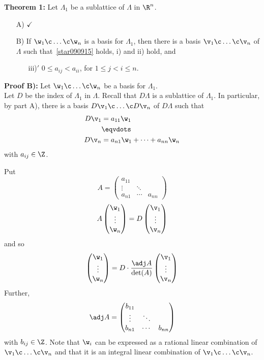\textbf{Theorem 1:} Let $\Lambda_1$ be a sublattice of $\Lambda$ in $\R^n$.
\begin{enumerate}
\item[A)] $\checkmark$
\item[B)] If $\w_1\c \dotsc\c \w_n$ is a basis for $\Lambda_1$, then there is a basis $\v_1\c \dotsc\c \v_n$ of $\Lambda$ such that~\eqref{star090915} holds, i) and ii) hold, and
\begin{enumerate}
\item[iii)$'$] $0\leq a_{ij} < a_{ii}$, for $1\leq j<i\leq n$.
\end{enumerate}
\end{enumerate}
\textbf{Proof B):} Let $\w_1\c \dotsc\c \w_n$ be a basis for $\Lambda_1$. \\ Let $D$ be the index of $\Lambda_1$ in $\Lambda$.  Recall that $D\Lambda$ is a sublattice of $\Lambda_1$.  In particular, by part A), there is a basis $D\v_1\c \dotsc\c D\v_n$ of $D\Lambda$ such that
\begin{align*}
D\v_1 &= a_{11}\w_1 \\
&\eqvdots \\
D\v_n &= a_{n1}\w_1 + \dotsb + a_{nn}\w_n
\end{align*}
with $a_{ij}\in\Z$.

Put
\[ A = \begin{pmatrix}
a_{11} & & \\
\vdots & \ddots & \\
a_{n1} & \cdots & a_{nn}
\end{pmatrix} \]
\[ A \begin{pmatrix}
\w_1 \\
\vdots \\
\w_n
\end{pmatrix} = 
D \begin{pmatrix}
\v_1 \\
\vdots \\
\v_n
\end{pmatrix} \]
and so
\[ \begin{pmatrix}
\w_1 \\
\vdots \\
\w_n
\end{pmatrix} =
D\cdot\frac{\adj A}{\det(A)} \begin{pmatrix}
\v_1 \\
\vdots \\
\v_n
\end{pmatrix} \]
Further,%
\[ \adj A = \begin{pmatrix}
b_{11} & & \\
\vdots & \ddots & \\
b_{n1} & \cdots & b_{nn}
\end{pmatrix} \]
with $b_{ij}\in\Z$.  Note that $\w_i$ can be expressed as a rational linear combination of $\v_1\c \dotsc\c \v_n$ and that it is an integral linear combination of $\v_1\c \dotsc\c \v_n$.%

